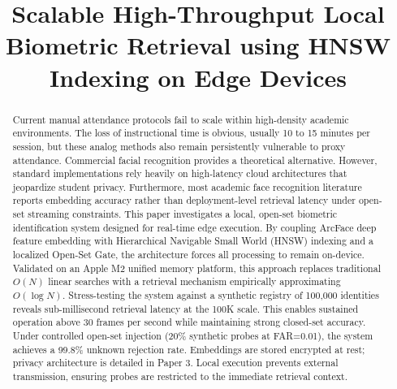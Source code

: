 \documentclass[conference]{IEEEtran}
\begin{document}
\title{Scalable High-Throughput Local Biometric Retrieval using HNSW Indexing on Edge Devices}

\author{
}

\maketitle

\begin{abstract}
Current manual attendance protocols fail to scale within high-density academic environments. The loss of instructional time is obvious, usually 10 to 15 minutes per session, but these analog methods also remain persistently vulnerable to proxy attendance. Commercial facial recognition provides a theoretical alternative. However, standard implementations rely heavily on high-latency cloud architectures that jeopardize student privacy. Furthermore, most academic face recognition literature reports embedding accuracy rather than deployment-level retrieval latency under open-set streaming constraints. This paper investigates a local, open-set biometric identification system designed for real-time edge execution. By coupling ArcFace deep feature embedding with Hierarchical Navigable Small World (HNSW) indexing and a localized Open-Set Gate, the architecture forces all processing to remain on-device. Validated on an Apple M2 unified memory platform, this approach replaces traditional $O(N)$ linear searches with a retrieval mechanism empirically approximating $O(\log N)$. Stress-testing the system against a synthetic registry of 100,000 identities reveals sub-millisecond retrieval latency at the 100K scale. This enables sustained operation above 30 frames per second while maintaining strong closed-set accuracy. Under controlled open-set injection (20\% synthetic probes at FAR=0.01), the system achieves a 99.8\% unknown rejection rate. Embeddings are stored encrypted at rest; privacy architecture is detailed in Paper 3. Local execution prevents external transmission, ensuring probes are restricted to the immediate retrieval context.
\end{abstract}
\end{document}
